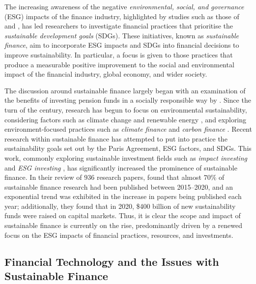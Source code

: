 \documentclass[a4paper, 11pt]{report}
\begin{document}
    The increasing awareness of the negative \emph{environmental, social, and governance} (ESG) impacts of the finance industry, highlighted by studies such as those of \citet{power-2020} and \citet{greenpeace-2021}, has led researchers to investigate financial practices that prioritise the \emph{sustainable development goals} (SDGs). These initiatives, known as \emph{sustainable finance}, aim to incorporate ESG impacts and SDGs into financial decisions to improve sustainability. In particular, a focus is given to those practices that produce a measurable positive improvement to the social and environmental impact of the financial industry, global economy, and wider society. 

    The discussion around sustainable finance largely began with an examination of the benefits of investing pension funds in a socially responsible way by \citeauthor{ferris-1986}. Since the turn of the century, research has begun to focus on environmental sustainability, considering factors such as climate change and renewable energy \citep{laan-2004}, and exploring environment-focused practices such as \emph{climate finance} \citep{hogarth-2012} and \emph{carbon finance} \citep{aglietta-2015}. Recent research within sustainable finance has attempted to put into practice the sustainability goals set out by the Paris Agreement, ESG factors, and SDGs. This work, commonly exploring sustainable investment fields such as \emph{impact investing} \citep{agrawal-2021} and \emph{ESG investing} \citep{alessandrini-2020}, has significantly increased the prominence of sustainable finance. In their review of $936$ research papers, \citet{kumar-2022} found that almost $70\%$ of sustainable finance research had been published between 2015--2020, and an exponential trend was exhibited in the increase in papers being published each year; additionally, they found that in 2020, \$400 billion of new sustainability funds were raised on capital markets. Thus, it is clear the scope and impact of sustainable finance is currently on the rise, predominantly driven by a renewed focus on the ESG impacts of financial practices, resources, and investments.


    \subsection{Financial Technology and the Issues with Sustainable Finance}
\end{document}
